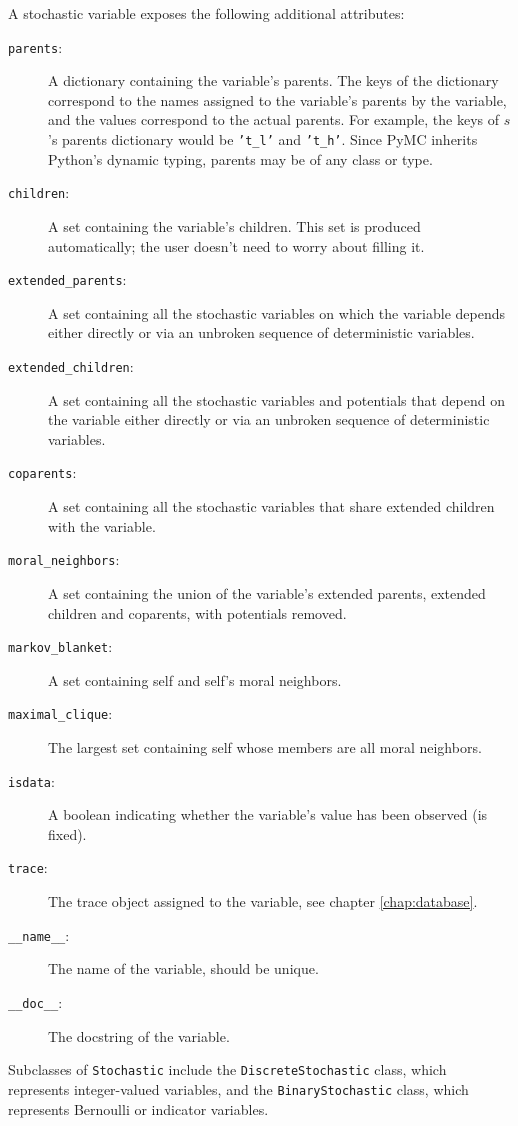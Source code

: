 A stochastic variable exposes the following additional attributes:
\begin{description}
    \item[\texttt{parents}:] A dictionary containing the variable's parents. The keys of the dictionary correspond to the names assigned to the variable's parents by the variable, and the values correspond to the actual parents. For example, the keys of $s$'s parents dictionary would be \texttt{'t\_l'} and \texttt{'t\_h'}. Since PyMC inherits Python's dynamic typing, parents may be of any class or type.
    \item[\texttt{children}:] A set containing the variable's children. This set is produced automatically; the user doesn't need to worry about filling it.
    \item[\texttt{extended\_parents}:] A set containing all the stochastic variables on which the variable depends either directly or via an unbroken sequence of deterministic variables.
    \item[\texttt{extended\_children}:] A set containing all the stochastic variables and potentials that depend on the variable either directly or via an unbroken sequence of deterministic variables.
    \item[\texttt{coparents}:] A set containing all the stochastic variables that share extended children with the variable.
    \item[\texttt{moral\_neighbors}:] A set containing the union of the variable's extended parents, extended children and coparents, with potentials removed.
    \item[\texttt{markov\_blanket}:] A set containing self and self's moral neighbors.
    \item[\texttt{maximal\_clique}:] The largest set containing self whose members are all moral neighbors.
    \item[\texttt{isdata}:] A boolean indicating whether the variable's value has been observed (is fixed).
    \item[\texttt{trace}:] The trace object assigned to the variable, see chapter \ref{chap:database}.
    \item[\texttt{\_\_name\_\_}:] The name of the variable, should be unique.
    \item[\texttt{\_\_doc\_\_}:] The docstring of the variable.
\end{description}

Subclasses of \texttt{Stochastic} include the \texttt{DiscreteStochastic} class, which represents integer-valued variables, and the \texttt{BinaryStochastic} class, which represents Bernoulli or indicator variables. 

